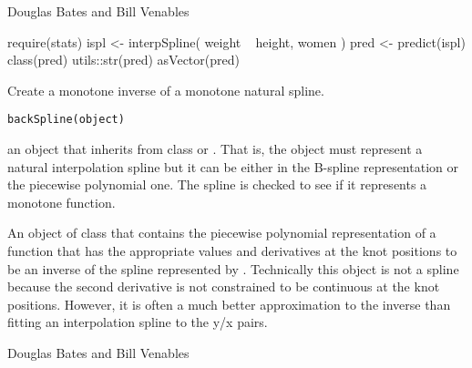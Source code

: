 %
\begin{Author}\relax
Douglas Bates and Bill Venables
\end{Author}
%
\begin{SeeAlso}\relax
{}
\end{SeeAlso}
%
\begin{Examples}
\begin{ExampleCode}
require(stats)
ispl <- interpSpline( weight ~ height,  women )
pred <- predict(ispl)
class(pred)
utils::str(pred)
asVector(pred)
\end{ExampleCode}
\end{Examples}
%
\begin{Description}\relax
Create a monotone inverse of a monotone natural spline.
\end{Description}
%
\begin{Usage}
\begin{verbatim}
backSpline(object)
\end{verbatim}
\end{Usage}
%
\begin{Arguments}
\begin{ldescription}
\item[\code{object}] an object that inherits from class  or
.  That is, the object must represent a natural
interpolation spline but it can be either in the B-spline
representation or the piecewise polynomial one.  The spline is
checked to see if it represents a monotone function.

\end{ldescription}
\end{Arguments}
%
\begin{Value}
An object of class  that contains the piecewise
polynomial representation of a function that has the appropriate
values and derivatives at the knot positions to be an inverse of the
spline represented by .  Technically this object is not a
spline because the second derivative is not constrained to be
continuous at the knot positions.  However, it is often a much better
approximation to the inverse than fitting an interpolation spline to
the y/x pairs.
\end{Value}
%
\begin{Author}\relax
Douglas Bates and Bill Venables
\end{Author}
%
\begin{SeeAlso}\relax
{}
\end{SeeAlso}
